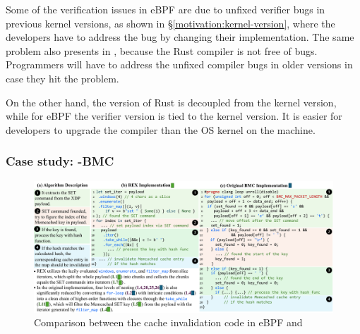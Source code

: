 
Some of the verification issues in eBPF are due to unfixed verifier bugs in
    previous kernel versions, as shown in \S\ref{motivation:kernel-version},
    where the developers have to address the bug by changing their
    implementation.
The same problem also presents in \projname{}, because the Rust compiler is not
    free of bugs.
Programmers will have to address the unfixed compiler bugs in older versions
    in case they hit the problem.

On the other hand, the version of Rust is decoupled from the kernel version, while
    for eBPF the verifier version is tied to the kernel version.
It is easier for developers to upgrade the compiler than the OS kernel on the
    machine.


\subsubsection{Case study: \projname{}-BMC}
\label{eval:bmc-case-study}

\begin{figure}[t]
    \includegraphics[width=1.0\linewidth]{figs/rusty-bmc.pdf}
    \centering
    \vspace{-10pt}
    \caption{Comparison between the cache invalidation code in eBPF
        and \projname{}}
    \vspace{-10pt}
    \label{fig:rust-code}
\end{figure}

